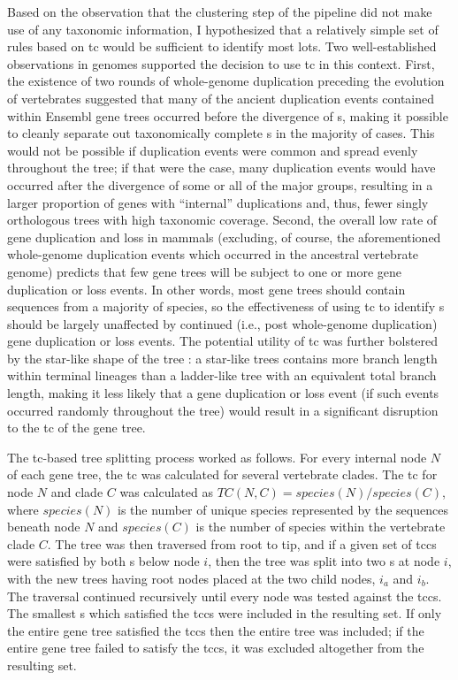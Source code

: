 Based on the observation that the clustering step of the \cmp pipeline
did not make use of any taxonomic information, I hypothesized that a
relatively simple set of rules based on \ac{tc} would be sufficient to
identify most \mammln \acp{lot}. Two well-established observations in
\mammln genomes supported the decision to use \ac{tc} in this
context. First, the existence of two rounds of whole-genome
duplication preceding the evolution of vertebrates \citep{Dehal2005}
suggested that many of the ancient duplication events contained within
Ensembl gene trees occurred before the divergence of \mamml{}s, making
it possible to cleanly separate out taxonomically complete \mammln
\subtr{}s in the majority of cases. This would not be possible if
duplication events were common and spread evenly throughout the
\mammln tree; if that were the case, many duplication events would
have occurred after the divergence of some or all of the major \mammln
groups, resulting in a larger proportion of \mammln genes with
``internal'' duplications and, thus, fewer singly orthologous trees
with high taxonomic coverage. Second, the overall low rate of gene
duplication and loss in mammals \citep{Demuth2006} (excluding, of
course, the aforementioned whole-genome duplication events which
occurred in the ancestral vertebrate genome) predicts that few \mammln
gene trees will be subject to one or more gene duplication or loss
events. In other words, most \mammln gene trees should contain
sequences from a majority of \mammln species, so the effectiveness of
using \ac{tc} to identify \mammln \subtr{}s should be largely
unaffected by continued (i.e., post whole-genome duplication) gene
duplication or loss events. The potential utility of \ac{tc} was
further bolstered by the star-like shape of the \mammln tree
\citep{BinindaEmonds2007}: a star-like trees contains more branch
length within terminal lineages than a ladder-like tree with an
equivalent total branch length, making it less likely that a gene
duplication or loss event (if such events occurred randomly throughout
the \mammln tree) would result in a significant disruption to the
\ac{tc} of the gene tree.

The \ac{tc}-based tree splitting process worked as follows. For every
internal node $N$ of each \cmp gene tree, the \ac{tc} was calculated
for several vertebrate clades. The \ac{tc} for node $N$ and clade $C$
was calculated as $TC(N,C) = species(N) / species(C) $, where
$species(N)$ is the number of unique species represented by the
sequences beneath node $N$ and $species(C)$ is the number of species
within the vertebrate clade $C$. The tree was then traversed from root
to tip, and if a given set of \acp{tcc} were satisfied by both
\subtr{}s below node $i$, then the tree was split into two \subtr{}s
at node $i$, with the new trees having root nodes placed at the two
child nodes, $i_a$ and $i_b$. The traversal continued recursively
until every node was tested against the \acp{tcc}. The smallest
\subtr{}s which satisfied the \acp{tcc} were included in the resulting
\subtr{} set. If only the entire gene tree satisfied the \acp{tcc}
then the entire tree was included; if the entire gene tree failed to
satisfy the \acp{tcc}, it was excluded altogether from the resulting
\subtr{} set.

